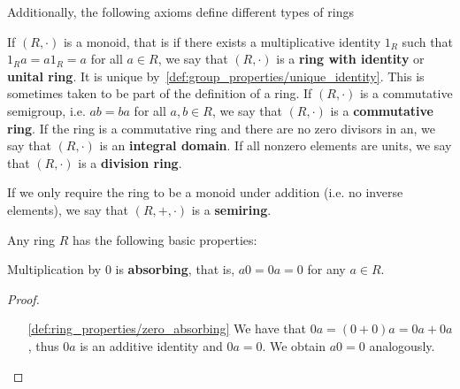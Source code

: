 \begin{definition}
  Additionally, the following axioms define different types of rings
  \begin{description}
     If \( (R, \cdot) \) is a monoid, that is if there exists a multiplicative identity \( 1_R \) such that \( 1_R a = a1_R = a \) for all \( a \in R \), we say that \( (R, \cdot) \) is a \textbf{ring with identity} or \textbf{unital ring}. It is unique by~\cref{def:group_properties/unique_identity}. This is sometimes taken to be part of the definition of a ring.
     If \( (R, \cdot) \) is a commutative semigroup, i.e. \( ab = ba \) for all \( a, b \in R \), we say that \( (R, \cdot) \) is a \textbf{commutative ring}.
     If the ring is a commutative ring and there are no zero divisors in an, we say that \( (R, \cdot) \) is an \textbf{integral domain}.
     If all nonzero elements are units, we say that \( (R, \cdot) \) is a \textbf{division ring}.
  \end{description}

  If we only require the ring to be a monoid under addition (i.e. no inverse elements), we say that \( (R, +, \cdot) \) is a \textbf{semiring}.
\end{definition}

\begin{proposition}\label{def:ring_properties}
  Any ring \( R \) has the following basic properties:
  \begin{defenum}
    \item\label{def:ring_properties/zero_absorbing} Multiplication by \( 0 \) is \textbf{absorbing}, that is, \( a0 = 0a = 0 \) for any \( a \in R \).
  \end{defenum}
\end{proposition}
\begin{proof}\mbox{}
  \begin{itemize}
    \item[\ref{def:ring_properties/zero_absorbing}] We have that \( 0a = (0 + 0)a = 0a + 0a \), thus \( 0a \) is an additive identity and \( 0a = 0 \). We obtain \( a0 = 0 \) analogously.
  \end{itemize}
\end{proof}

